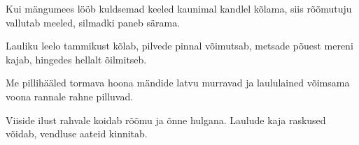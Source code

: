 Kui m\"angumees l\"o\"ob kuldsemad keeled
kaunimal kandlel k\~olama,
siis r\~o\~omutuju vallutab meeled,
silmadki paneb s\"arama.

Lauliku leelo tammikust k\~olab,
pilvede pinnal v\~oimutsab,
metsade p\~ouest mereni kajab,
hingedes hellalt \~oilmitseb.

Me pillih\"a\"aled tormava hoona
m\"andide latvu murravad
ja laululained v\~oimsama voona
rannale rahne pilluvad.

Viiside ilust rahvale koidab
r\~o\~omu ja \~onne hulgana.
Laulude kaja raskused v\~oidab,
vendluse aateid kinnitab.
